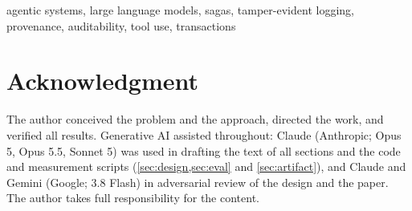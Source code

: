 \documentclass[conference]{IEEEtran}
\begin{document}
\begin{IEEEkeywords}
agentic systems, large language models, sagas, tamper-evident logging,
provenance, auditability, tool use, transactions
\end{IEEEkeywords}










\section*{Acknowledgment}
The author conceived the problem and the approach, directed the work, and verified all results.
Generative AI assisted throughout: Claude (Anthropic; Opus 5, Opus 5.5, Sonnet 5) was used in drafting
the text of all sections and the code and measurement scripts (\cref{sec:design,sec:eval} and
\cref{sec:artifact}), and Claude and Gemini (Google; 3.8 Flash) in adversarial review of the design and
the paper. The author takes full responsibility for the content.




\raggedbottom
\appendices
{}

\end{document}
